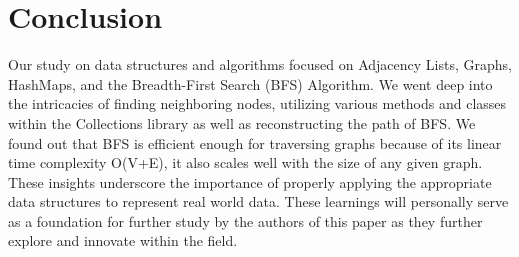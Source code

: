 \section*{Conclusion}
Our study on data structures and algorithms focused on Adjacency Lists, Graphs, HashMaps, and the Breadth-First Search (BFS) Algorithm. We went deep into the intricacies of finding neighboring nodes, utilizing various methods and classes within the Collections library as well as reconstructing the path of BFS. We found out that BFS is efficient enough for traversing graphs because of its linear time complexity O(V+E), it also scales well with the size of any given graph. These insights underscore the importance of properly applying the appropriate data structures to represent real world data. These learnings will personally serve as a foundation for further study by the authors of this paper as they further explore and innovate within the field.